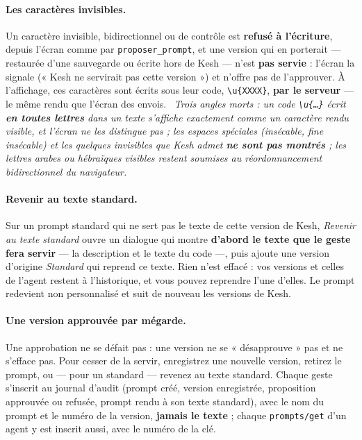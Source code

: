 \documentclass[a4paper,11pt,oneside]{article}
\begin{document}
\paragraph{Les caractères invisibles.} Un caractère invisible, bidirectionnel ou de contrôle est \textbf{refusé à l'écriture}, depuis l'écran comme par \texttt{proposer\_prompt}, et une version qui en porterait --- restaurée d'une sauvegarde ou écrite hors de Kesh --- n'est \textbf{pas servie} : l'écran la signale (« Kesh ne servirait pas cette version ») et n'offre pas de l'approuver. À l'affichage, ces caractères sont écrits sous leur code, \texttt{\textbackslash{}u\{XXXX\}}, \textbf{par le serveur} --- le même rendu que l'écran des envois. \keshAttention\ \emph{Trois angles morts : un code \texttt{\textbackslash{}u\{…\}} écrit \textbf{en toutes lettres} dans un texte s'affiche exactement comme un caractère rendu visible, et l'écran ne les distingue pas ; les espaces spéciales (insécable, fine insécable) et les quelques invisibles que Kesh admet \textbf{ne sont pas montrés} ; les lettres arabes ou hébraïques visibles restent soumises au réordonnancement bidirectionnel du navigateur.}

\paragraph{Revenir au texte standard.} Sur un prompt standard qui ne sert pas le texte de cette version de Kesh, \emph{Revenir au texte standard} ouvre un dialogue qui montre \textbf{d'abord le texte que le geste fera servir} --- la description et le texte du code ---, puis ajoute une version d'origine \emph{Standard} qui reprend ce texte. Rien n'est effacé : vos versions et celles de l'agent restent à l'historique, et vous pouvez reprendre l'une d'elles. Le prompt redevient non personnalisé et suit de nouveau les versions de Kesh.

\paragraph{Une version approuvée par mégarde.} Une approbation ne se défait pas : une version ne se « désapprouve » pas et ne s'efface pas. Pour cesser de la servir, enregistrez une nouvelle version, retirez le prompt, ou --- pour un standard --- revenez au texte standard. Chaque geste s'inscrit au journal d'audit (prompt créé, version enregistrée, proposition approuvée ou refusée, prompt rendu à son texte standard), avec le nom du prompt et le numéro de la version, \textbf{jamais le texte} ; chaque \texttt{prompts/get} d'un agent y est inscrit aussi, avec le numéro de la clé.
\end{document}
